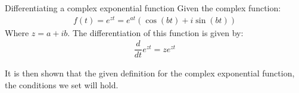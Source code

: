 \begin{theorem}{Differentiating a complex exponential function}{}
Given the complex function:
\begin{align*}
f(t)=e^{zt}=e^{at}(\cos(bt)+i\sin(bt))
\end{align*}
Where $z=a+ib$. The differentiation of this function is given by:
\begin{align*}
\dfrac{d}{dt}e^{zt}=ze^{zt}
\end{align*}
\end{theorem}

\noindent
It is then shown that the given definition for the complex exponential function, the conditions we set will hold.